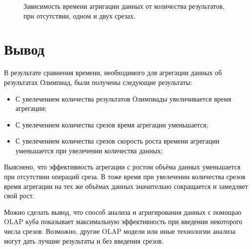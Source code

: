 \newpage
\begin{figure}[!h]
	\caption{Зависимость времени агригации данных от количества результатов, при отсутствии, одном и двух срезах.}
	\label{ing:graph}
\end{figure}

\section*{Вывод}

В результате сравнения времени, необходимого для агрегации данных об результатах Олимпиад, были получены следующие результаты:

\begin{itemize}
	
	\item  С увелечением количества результатов Олимпиады увеличивается время агрегации;
	
	\item  С увелечением количества срезов время агрегации уменьшается;
	
	\item   С увелечением количества срезов скорость роста времени агрегации уменьшается при увелечении количества данных;
	
\end{itemize}

Выяснено, что эффективность агрегации с ростом объёма данных уменьшается при отсутствии операций среза. В тоже время при увелечении количества срезов время агрегации на тех же объёмах данных значительно сокращается и замедляет свой рост. 

Можно сделать вывод, что способ анализа и агригирования данных с помощью OLAP куба показывает максимальную эффективность при введении некоторого числа срезов. Возможно, другие OLAP модели или  иные технологии анализа могут дать лучшие результаты и без введения срезов.




